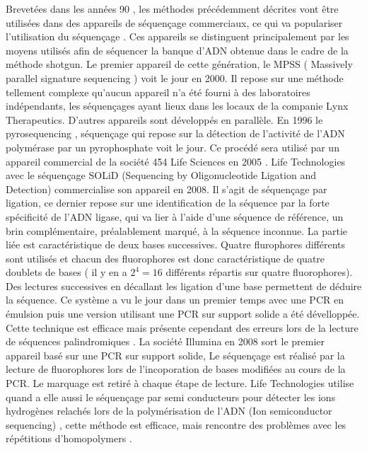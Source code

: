 \documentclass[a4paper,11pt]{article}
\begin{document}
Brevetées dans les années 90 \cite{tsien1991dna,farinelli1998method}, les méthodes précédemment décrites vont être utilisées dans des appareils de séquençage commerciaux, ce qui va populariser l'utilisation du séquençage \cite{Schuster2007}. Ces appareils se distinguent principalement par les moyens utilisés afin de séquencer la banque d'ADN obtenue dans le cadre de la méthode shotgun. Le premier appareil de cette génération, le MPSS ( Massively parallel signature sequencing \cite{Brenner2000}) voit le jour en 2000. Il repose sur une méthode tellement complexe qu'aucun appareil n'a été fourni à des laboratoires indépendants, les séquençages ayant lieux dans les locaux de la companie Lynx Therapeutics. D'autres appareils sont développés en parallèle. En 1996 le pyrosequencing \cite{Ronaghi1996}, séquençage qui repose sur la détection de l'activité de l'ADN polymérase par un pyrophosphate voit le jour. Ce procédé sera utilisé par un appareil commercial de la société 454 Life Sciences en 2005 \cite{Margulies2005}. Life Technologies avec le séquençage SOLiD \cite{mckernan2007reagents,Cloonan2008} (Sequencing by Oligonucleotide Ligation and Detection) commercialise son appareil en 2008. Il s'agit de séquençage par ligation, ce dernier repose sur une identification de la séquence par la forte spécificité de l'ADN ligase, qui va lier à l'aide d'une séquence de référence, un brin complémentaire, préalablement marqué, à la séquence inconnue. La partie liée est caractéristique de deux bases successives. Quatre flurophores différents sont utilisés et chacun des fluorophores est donc caractéristique de quatre doublets de bases ( il y en a $2^{4}=16$ différents répartis sur quatre fluorophores). Des lectures successives en décallant les ligation d'une base permettent de déduire la séquence. Ce système a vu le jour dans un premier temps avec une PCR en émulsion puis une version utilisant une PCR sur support solide a été dévelloppée. Cette technique est efficace mais présente cependant des erreurs lors de la lecture de séquences palindromiques \cite{Huang2012}. La société Illumina en 2008 \cite{Bentley2008} sort le premier appareil basé sur une PCR sur support solide, Le séquençage est réalisé par la lecture de fluorophores lors de l'incoporation de bases modifiées au cours de la PCR. Le marquage est retiré à chaque étape de lecture. Life Technologies utilise quand a elle aussi le séquençage par semi conducteurs pour détecter les ions hydrogènes relachés lors de la polymérisation de l'ADN (Ion semiconductor sequencing) \cite{Rusk2010}, cette méthode est efficace, mais rencontre des  problèmes avec les répétitions d'homopolymers \cite{Rusk2010}. 
\end{document}
